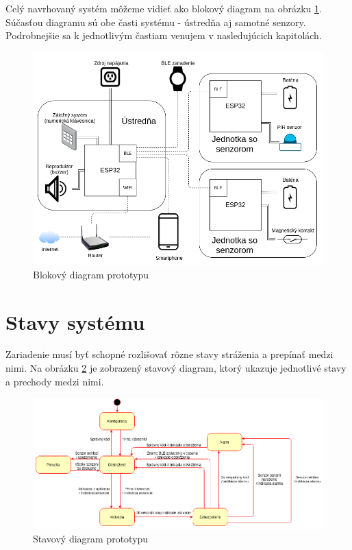 Celý navrhovaný systém môžeme vidieť ako blokový diagram na obrázku \ref{fig:navrh_diagram}. Súčasťou diagramu sú obe časti systému - ústredňa aj samotné senzory. Podrobnejšie sa k jednotlivým častiam venujem v nasledujúcich kapitolách.

\begin{figure}[ht]
    \centering
    \includegraphics[scale=0.4]{obrazky-figures/block_diagram.png}
    \caption{Blokový diagram prototypu}
    \label{fig:navrh_diagram}
\end{figure}

\section{Stavy systému}

Zariadenie musí byť schopné rozlišovať rôzne stavy stráženia a prepínať medzi nimi. Na obrázku \ref{fig:state_diagram} je zobrazený stavový diagram, ktorý ukazuje jednotlivé stavy a prechody medzi nimi.

\begin{figure}[!ht]
    \centering
    \includegraphics[width=\linewidth]{obrazky-figures/state_diagram.png}
    \caption{Stavový diagram prototypu}
    \label{fig:state_diagram}
\end{figure}

